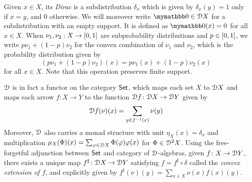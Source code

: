  Given $x \in X$, its \emph{Dirac} is a subdistribution $\delta_x$ which is given by $\delta_x(y)=1$ only if $x=y$, and $0$ otherwise. We will moreover write $\emptydist \in \distf X$ for a subdistribution with an empty support. It is defined as $\emptydist(x)=0$ for all $x \in X$. When $\nu_1, \nu_2 : X \to \interval{0}{1}$ are subprobability distributions and $p \in \interval{0}{1}$, we write $p\nu_1 + (1-p)\nu_2$ for the convex combination of $\nu_1$ and $\nu_2$, which is the probability distribution given by $$(p \nu_1 + (1-p) \nu_2)(x) = p\nu_1(x) + (1-p)\nu_2(x)$$
 for all $x \in X$. Note that this operation preserves finite support. 
 
  $\mathcal{D}$ is in fact a functor on the category ${\mathsf{Set}}$, which maps each set $X$ to $\mathcal{D} X$ and maps each arrow $f : X \to Y$ to the function $\mathcal{D} f \colon \mathcal{D} X \to \mathcal{D} Y$ given by $$\mathcal{D} f (\nu)(x) = \sum_{y \in f^{-1}(x)} \nu(y)$$
   Moreover, $\mathcal{D}$ also  carries a monad structure with unit  $\eta_X(x) = \delta_x$ and multiplication $\mu_X(\Phi)(x) = \sum_{\varphi \in \mathcal{D} X }\Phi(\varphi)\varphi(x)$ for $\Phi \in \mathcal{D}^2 X$. Using the free-forgetful adjunction between ${\mathsf{Set}}$ and category of $\mathcal{D}$-algebras, given $f \colon X \to \mathcal{D} Y$, there exists a unique map $f^\sharp \colon \mathcal{D} X \to \mathcal{D} Y$ satisfying $f = f^\sharp \circ \delta$ called the \emph{convex extension of $f$}, and explicitly given by $f^\sharp(\nu)(y) = \sum_{x \in X} \nu(x) f(x)(y)$.
